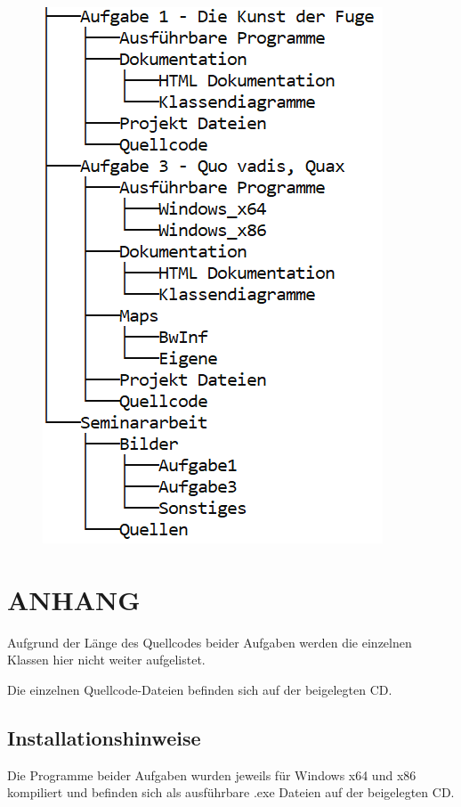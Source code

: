 \documentclass[a4paper,12pt]{article}
\begin{document}
\begin{figure}[H]
    \includegraphics[width=.7\linewidth]{Bilder/Sonstiges/CDVerzeichnis.png}
\end{figure}


\newpage
\section{ANHANG}
Aufgrund der Länge des Quellcodes beider Aufgaben werden die einzelnen Klassen hier nicht weiter aufgelistet.

Die einzelnen Quellcode-Dateien befinden sich auf der beigelegten CD.

\subsection{Installationshinweise}
Die Programme beider Aufgaben wurden jeweils für Windows x64 und x86 kompiliert und befinden sich als ausführbare .exe Dateien auf der beigelegten CD.
\end{document}
